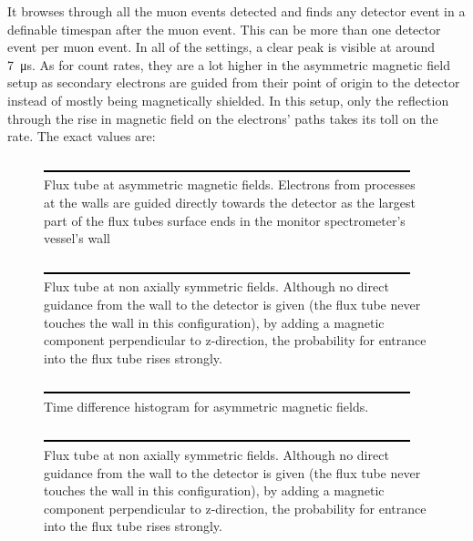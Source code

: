   It browses through all the muon events detected and finds any detector event in a definable timespan after the muon event. This can be more than one detector event per  muon event. In all of the settings, a clear peak is visible at around \SI{7}{\micro\second}. As for count rates, they are a lot higher in the asymmetric magnetic field setup as secondary electrons are guided from their point of origin to the detector instead of mostly being magnetically shielded. In this setup, only the reflection through the rise in magnetic field on the electrons' paths takes its toll on the rate.
  The exact values are:
  
  
  \begin{figure}
	\label{fig:monSpec:asymmetric magnetic field}
	\caption{Flux tube at asymmetric magnetic fields. Electrons from processes at the walls are guided directly towards the detector as the largest part of the flux tubes surface ends in the monitor spectrometer's vessel's wall}
  	\includegraphics{graphics/dummy.eps}
  \end{figure}

    \begin{figure}
	\label{fig:monSpec:non axially symmetric magnetic field}
	\caption{Flux tube at non axially symmetric fields. Although no direct guidance from the wall to the detector is given (the flux tube never touches the wall in this configuration), by adding a magnetic component perpendicular to z-direction, the probability for entrance into the flux tube rises strongly.}
  	\includegraphics{graphics/dummy.eps}
  \end{figure}
  
  \begin{figure}
	\label{fig:monSpec:timeDifferences asymmetric magnetic field}
	\caption{Time difference histogram for asymmetric magnetic fields.}
  	\includegraphics{graphics/dummy.eps}
  \end{figure}
  
  \begin{figure}
	\label{fig:monSpec:timeDifferences non axially symmetric magnetic field}
	\caption{Flux tube at non axially symmetric fields. Although no direct guidance from the wall to the detector is given (the flux tube never touches the wall in this configuration), by adding a magnetic component perpendicular to z-direction, the probability for entrance into the flux tube rises strongly.}
  	\includegraphics{graphics/dummy.eps}
  \end{figure}  
